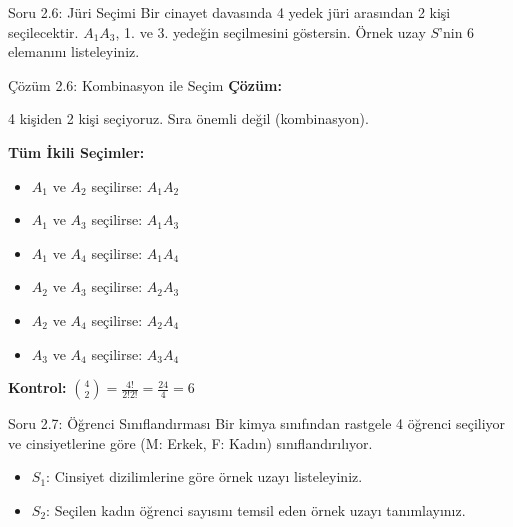 \documentclass[light]{lutbeamer}
\begin{document}
\begin{frame}{Soru 2.6: Jüri Seçimi}
    Bir cinayet davasında 4 yedek jüri arasından 2 kişi seçilecektir. $A_1A_3$, 1. ve 3. yedeğin seçilmesini göstersin. Örnek uzay $S$'nin 6 elemanını listeleyiniz.
\end{frame}

\begin{frame}{Çözüm 2.6: Kombinasyon ile Seçim}
    \color{blue}
    \textbf{Çözüm:}
    
    4 kişiden 2 kişi seçiyoruz. Sıra önemli değil (kombinasyon).
    
    \vspace{0.3cm}
    \textbf{Tüm İkili Seçimler:}
    \begin{itemize}
        \item $A_1$ ve $A_2$ seçilirse: $A_1A_2$
        \item $A_1$ ve $A_3$ seçilirse: $A_1A_3$
        \item $A_1$ ve $A_4$ seçilirse: $A_1A_4$
        \item $A_2$ ve $A_3$ seçilirse: $A_2A_3$
        \item $A_2$ ve $A_4$ seçilirse: $A_2A_4$
        \item $A_3$ ve $A_4$ seçilirse: $A_3A_4$
    \end{itemize}
    
    \vspace{0.3cm}
    \begin{center}
    \end{center}
    
    \textbf{Kontrol:} $\binom{4}{2} = \frac{4!}{2!2!} = \frac{24}{4} = 6$ \checkmark
\end{frame}

\begin{frame}{Soru 2.7: Öğrenci Sınıflandırması}
    Bir kimya sınıfından rastgele 4 öğrenci seçiliyor ve cinsiyetlerine göre (M: Erkek, F: Kadın) sınıflandırılıyor.
    \begin{itemize}
        \item $S_1$: Cinsiyet dizilimlerine göre örnek uzayı listeleyiniz.
        \item $S_2$: Seçilen kadın öğrenci sayısını temsil eden örnek uzayı tanımlayınız.
    \end{itemize}
\end{frame}
\end{document}

